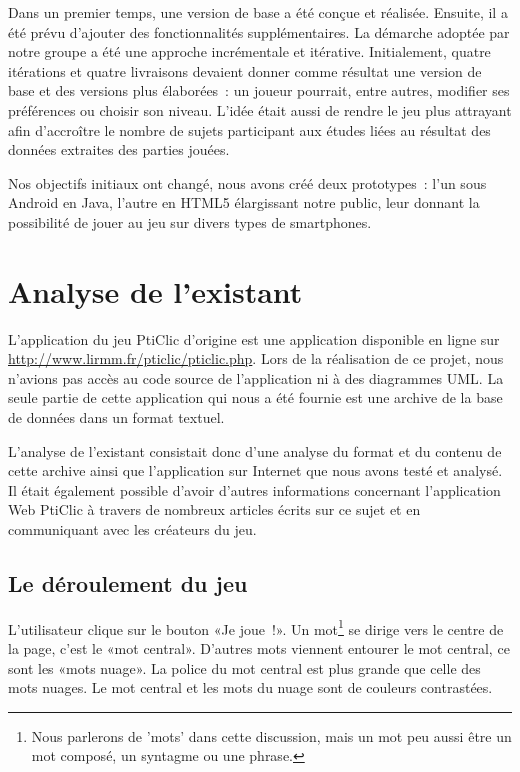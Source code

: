 \documentclass[a4paper,11pt,french]{article}
\begin{document}
Dans un premier temps, une version de base a été conçue et réalisée. Ensuite, il a été prévu d'ajouter des fonctionnalités supplémentaires. La démarche adoptée par notre groupe a été une approche incrémentale et itérative. Initialement, quatre itérations et quatre livraisons devaient donner comme résultat une version de base et des versions plus élaborées~: un joueur pourrait, entre autres, modifier ses préférences ou choisir son niveau. L'idée était aussi de rendre le jeu plus attrayant afin d'accroître le nombre de sujets participant aux études liées au résultat des données extraites des parties jouées.

Nos objectifs initiaux ont changé, nous avons créé deux prototypes~: l'un sous Android en Java, l'autre en HTML5 élargissant notre public, leur donnant la possibilité de jouer au jeu sur divers types de smartphones.  


\pagebreak

 
\section{Analyse de l'existant}

L'application du jeu PtiClic d'origine est une application disponible en ligne sur \url{http://www.lirmm.fr/pticlic/pticlic.php}. Lors de
la réalisation de ce projet, nous n'avions pas accès au code source de l'application ni à des diagrammes UML. La seule partie de cette
application qui nous a été fournie est une archive de la base de données dans un format textuel.

L'analyse de l'existant consistait donc d'une analyse du format et du contenu de cette archive ainsi que l'application sur Internet que nous avons testé et analysé. Il était également possible d'avoir d'autres informations concernant l'application Web PtiClic à travers de nombreux articles écrits sur ce sujet et en communiquant avec les créateurs du jeu.

\subsection{Le déroulement du jeu}

L'utilisateur clique sur le bouton «Je joue~!». Un mot\footnote{Nous parlerons de 'mots' dans cette discussion, mais un mot peu aussi être un mot composé, un syntagme ou une phrase.} se dirige vers le centre de la page, c'est le «mot central». D'autres mots viennent entourer le mot central, ce sont les «mots nuage». La police du mot central est plus grande que celle des mots nuages. Le mot central et les mots du nuage sont de couleurs contrastées.
\end{document}
